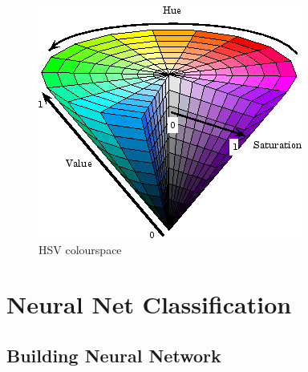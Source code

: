 \begin{figure}[H]
	\centering
	\includegraphics[width=\linewidth]{images/hsv.jpg}
	\caption{HSV colourspace}\label{fig:hsv}
	\endminipage\hfill
\end{figure}



\section{Neural Net Classification}
\subsection{Building Neural Network}
